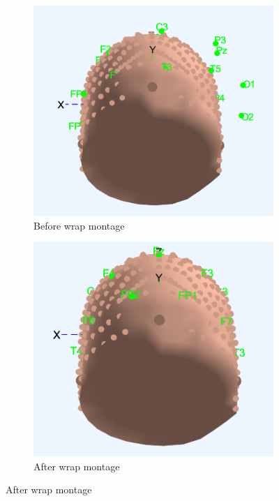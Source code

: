 \documentclass[hidelinks,12pt]{article}
\begin{document}
		\begin{figure}[!h]
			\centering
			\begin{subfigure}{0.3\textwidth}
				\centering
				\includegraphics[width=\linewidth]{19}
				\caption{Before wrap montage}
			\end{subfigure}
			\hspace{1cm}
			\begin{subfigure}{0.3\textwidth}
				\centering
				\includegraphics[width=\linewidth]{20}
				\caption{After wrap montage}
			\end{subfigure}
		\end{figure}
		
\end{document}
